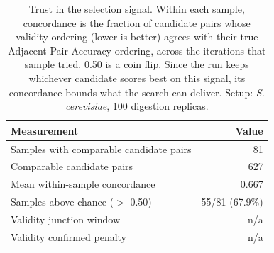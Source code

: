 \begin{table}[!tb]
  \centering
  \caption{Trust in the selection signal. Within each sample, concordance is the fraction of candidate pairs whose validity ordering (lower is better) agrees with their true Adjacent Pair Accuracy ordering, across the iterations that sample tried. 0.50 is a coin flip. Since the run keeps whichever candidate scores best on this signal, its concordance bounds what the search can deliver. Setup: \textnormal{\textnormal{\textit{S. cerevisiae}}}, 100 digestion replicas.}
  \label{tab:validity_concordance_yeast_r100}
  \begin{tabular}{lr}
    \toprule
    Measurement & Value \\
    \midrule
    Samples with comparable candidate pairs & 81 \\
    Comparable candidate pairs & 627 \\
    Mean within-sample concordance & 0.667 \\
    Samples above chance ($>$ 0.50) & 55/81 (67.9\%) \\
    Validity junction window & n/a \\
    Validity confirmed penalty & n/a \\
    \bottomrule
  \end{tabular}
\end{table}
